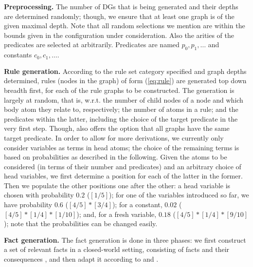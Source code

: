 \textbf{Preprocessing.}
The number of DGs that is being generated and their depths are determined randomly; though, we ensure that at least one graph is of the given maximal depth.
Note that all random selections we mention are within the bounds given in the configuration under consideration.
Also the arities of the predicates are selected at arbitrarily. 
Predicates are named ${p_0},p_1,\dots$ and constants $c_0,c_1,\dots$.

\textbf{Rule generation.}
According to the rule set category specified and graph depths determined, rules (nodes in the graph) of form (\ref{eq:rule}) are generated top down breadth first, for each of the rule graphs to be constructed. 
The generation is largely at random, that is, w.r.t.
the number of child nodes of a node and which body atom they relate to, respectively; 
the number of atoms in a rule; and the predicates within the latter, including the choice of the target predicate in the very first step. Though, \tool also offers the option that all graphs have the same target predicate.
% 
In order to allow for more derivations, we currently only consider variables as terms in head atoms; the choice of the remaining terms is based on probabilities as described in the following. 
Given the atoms to be considered (in terms of their number and predicates) and an arbitrary choice of head variables, we first determine a position for each of the latter in the former. Then we populate the other positions one after the other: a head variable is chosen with probability $0.2$ ($[1/5]$); for one of the variables introduced so far, we have probability $0.6$ ($[4/5] * [3/4]$); for a constant, $0.02$ ($[4/5] * [1/4] * [1/10]$); and, for a fresh variable, $0.18$ ($[4/5] * [1/4] * [9/10]$); note that the probabilities can be changed easily.

\textbf{Fact generation.}
The fact generation is done in three phases: we first construct a set \db of relevant facts in a closed-world setting, consisting of {\support facts} \sfacts and their {consequences} \cfacts, and then adapt it according to \nowa and \nnoise.

